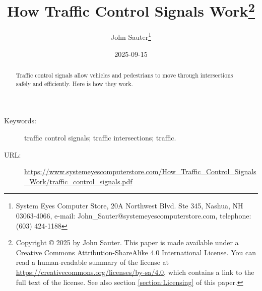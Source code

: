 \documentclass[letterpaper,twoside]{article}
\begin{document}
\title{How Traffic Control Signals Work\footnote{Copyright
    {\copyright} 2025 by John Sauter.
    This paper is made available under a
    Creative Commons Attribution-ShareAlike 4.0 International License.
    You can read a human-readable summary of the license at
    \href{https://creativecommons.org/licenses/by-sa/4.0}{https://creativecommons.org/licenses/by-sa/4.0},
    which contains a link to the full text of the license.
    See also section \ref{section:Licensing} of this paper.}
}
\author{John Sauter\footnote{
    System Eyes Computer Store,
    20A Northwest Blvd.  Ste 345,
    Nashua, NH  03063-4066,
    e-mail: John\_Sauter@systemeyescomputerstore.com,
    telephone: (603) 424-1188}}

\date{2025-09-15}
\maketitle
\begin{abstract}
  Traffic control signals allow vehicles and pedestrians to move through
  intersections safely and efficiently.  Here is how they work.
\end{abstract}
\begin{description}
\item[Keywords:]traffic control signals; traffic intersections; traffic.
\item[URL:]\href{https://www.systemeyescomputerstore.com/How\_Traffic\_Control\_Signals\_Work/traffic\_control\_signals.pdf}{https://www.systemeyescomputerstore.com/How\_Traffic\_Control\_Signals\_Work/traffic\_control\_signals.pdf}
\end{description}
\newpage
\end{document}
